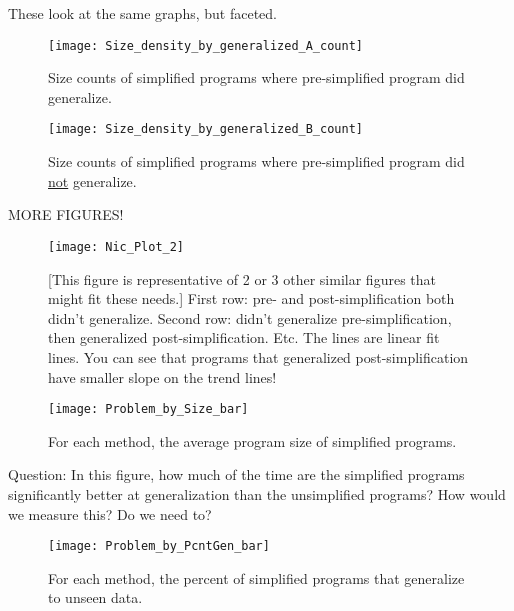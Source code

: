 These look at the same graphs, but faceted.

\begin{figure}[t] %
\centering
\texttt{[image: Size\_density\_by\_generalized\_A\_count]}
\caption{Size counts of simplified programs where pre-simplified program did generalize.}
\label{fig:count:pre-simp-gen-true}
\end{figure}

\begin{figure}[t] %
\centering
\texttt{[image: Size\_density\_by\_generalized\_B\_count]}
\caption{Size counts of simplified programs where pre-simplified program did \underline{not} generalize.}
\label{fig:count:pre-simp-gen-true}
\end{figure}

MORE FIGURES!

\begin{figure*}[t] %
\centering
\texttt{[image: Nic\_Plot\_2]} %
\caption{[This figure is representative of 2 or 3 other similar figures that might fit these needs.] First row: pre- and post-simplification both didn't generalize. Second row: didn't generalize pre-simplification, then generalized post-simplification. Etc. The lines are linear fit lines. You can see that programs that generalized post-simplification have smaller slope on the trend lines!}
\label{fig:nic-plot}
\end{figure*}

\begin{figure*}[t] %
\centering
\texttt{[image: Problem\_by\_Size\_bar]} %
\caption{For each method, the average program size of simplified programs.}
\label{fig:bar:size}
\end{figure*}

Question: In this figure, how much of the time are the simplified programs significantly better at generalization than the unsimplified programs? How would we measure this? Do we need to?

\begin{figure*}[t] %
\centering
\texttt{[image: Problem\_by\_PcntGen\_bar]} %
\caption{For each method, the percent of simplified programs that generalize to unseen data.}
\label{fig:bar:percent_generalization}
\end{figure*}

